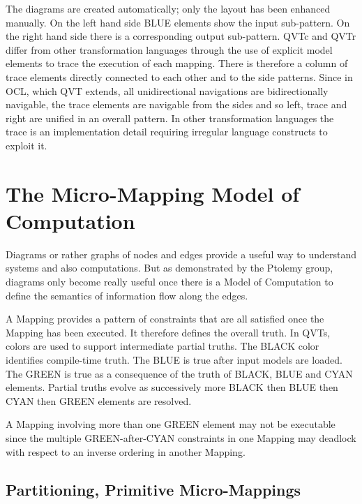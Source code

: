 \documentclass[conference]{IEEEtran}
\begin{document}
The diagrams are created automatically; only the layout has been enhanced manually. On the left hand side BLUE elements show the input sub-pattern. On the right hand side there is a corresponding output sub-pattern. QVTc and QVTr differ from other transformation languages through the use of explicit model elements to trace the execution of each mapping. There is therefore a column of trace elements directly connected to each other and to the side patterns. Since in OCL, which QVT extends, all unidirectional navigations are bidirectionally navigable, the trace elements are navigable from the sides and so left, trace and right are unified in an overall pattern. In other transformation languages the trace is an implementation detail requiring irregular language constructs to exploit it.

\section{The Micro-Mapping Model of Computation}\label{The Micro-Mapping Model of Computation}

Diagrams or rather graphs of nodes and edges provide a useful way to understand systems and also computations. But as demonstrated by the Ptolemy group, diagrams only become really useful once there is a Model of Computation \cite{moc} to define the semantics of information flow along the edges.%

A Mapping provides a pattern of constraints that are all satisfied once the Mapping has been executed. It therefore defines the overall truth. In QVTs, colors are used to support intermediate partial truths. The BLACK color identifies compile-time truth. The BLUE is true after input models are loaded. The GREEN  is true as a consequence of the truth of BLACK, BLUE and CYAN elements. Partial truths evolve as successively more BLACK then BLUE then CYAN then GREEN elements are resolved.

A Mapping involving more than one GREEN element may not be executable since the multiple GREEN-after-CYAN constraints in one Mapping may deadlock with respect to an inverse ordering in another Mapping. 

\subsection{Partitioning, Primitive Micro-Mappings}\label{Partitioning}\label{Primitive Micro-Mapping}
\end{document}
